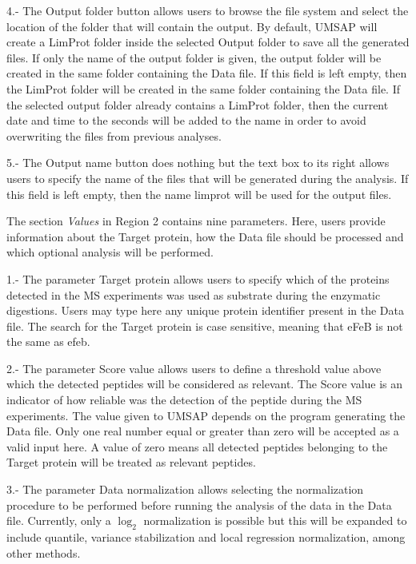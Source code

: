 \num{4}.- The Output folder\label{par:limprotOutFolder} button allows users to browse the file system and select the location of the folder that will contain the output. By default, UMSAP will create a LimProt folder inside the selected Output folder to save all the generated files. If only the name of the output folder is given, the output folder will be created in the same folder containing the Data file. If this field is left empty, then the LimProt folder will be created in the same folder containing the Data file. If the selected output folder already contains a LimProt folder, then the current date and time to the seconds will be added to the name in order to avoid overwriting the files from previous analyses.

\num{5}.- The Output name button does nothing but the text box to its right allows users to specify the name of the files that will be generated during the analysis. If this field is left empty, then the name limprot will be used for the output files. 

The section \textit{Values} in Region \num{2} contains nine parameters. Here, users provide information about the Target protein, how the Data file should be processed and which optional analysis will be performed.

\num{1}.- The parameter Target protein\label{par:limprotTargetProtein} allows users to specify which of the proteins detected in the MS experiments was used as substrate during the enzymatic digestions. Users may type here any unique protein identifier present in the Data file. The search for the Target protein is case sensitive, meaning that eFeB is not the same as efeb.

\num{2}.- The parameter Score value\label{par:limprotScoreValue} allows users to define a threshold value above which the detected peptides will be considered as relevant. The Score value is an indicator of how reliable was the detection of the peptide during the MS experiments. The value given to UMSAP depends on the program generating the Data file. Only one real number equal or greater than zero will be accepted as a valid input here. A value of zero means all detected peptides belonging to the Target protein will be treated as relevant peptides.

\num{3}.- The parameter Data normalization allows selecting the normalization procedure to be performed before running the analysis of the data in the Data file. Currently, only a $\log_2$ normalization is possible but this will be expanded to include quantile, variance stabilization and local regression normalization, among other methods. 

